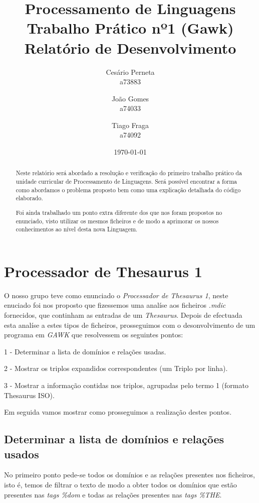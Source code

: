 \documentclass{report}
\title{Processamento de Linguagens\\ \textbf{Trabalho Prático nº1 (Gawk)}\\ Relatório de Desenvolvimento}
\author{Cesário Perneta\\ a73883 \and João Gomes\\ a74033 \and Tiago Fraga\\ a74092}
\date{\today}
\def\titulo#1{\section{#1}}
\begin{document}

\maketitle

\begin{abstract}
    Neste relatório será abordado a resolução e verificação do primeiro trabalho prático da unidade curricular de Processamento de Linguagens. Será possível encontrar a forma como abordamos o problema proposto bem como uma explicação detalhada do código elaborado.
    
    Foi ainda trabalhado um ponto extra diferente dos que nos foram propostos no enunciado, visto utilizar os mesmos ficheiros e de modo a aprimorar os nossos conhecimentos ao nível desta nova Linguagem.
\end{abstract}

\tableofcontents

\chapter{ Processador de Thesaurus 1} \label{intro}
    
    O nosso grupo teve como enunciado o \textit{Processador de Thesaurus 1}, neste enuciado foi nos proposto que fizessemos uma analíse aos ficheiros \textit{.mdic} fornecidos, que continham as entradas de um \textit{Thesaurus}.
    Depois de efectuada esta analíse a estes tipos de ficheiros, prosseguimos com o desonvolvimento de um programa em \textit{GAWK} que resolvessem os seguintes pontos:
        
        1 - Determinar a lista de domínios e relações usadas.
        
        2 - Mostrar os triplos expandidos correspondentes (um Triplo por linha).
        
        3 - Mostrar a informação contidas nos triplos, agrupadas pelo termo 1 (formato Thesaurus ISO).

    Em seguida vamos mostrar como prosseguimos a realização destes pontos. 

\titulo{ Determinar a lista de domínios e relações usados }

    No primeiro ponto pede-se todos os domínios e as relações presentes nos ficheiros, isto é, temos de filtrar o texto de modo a obter todos os domínios que estão presentes nas \textit{tags \%dom} e todas as relações presentes nas \textit{tags \%THE}.
\end{document}
